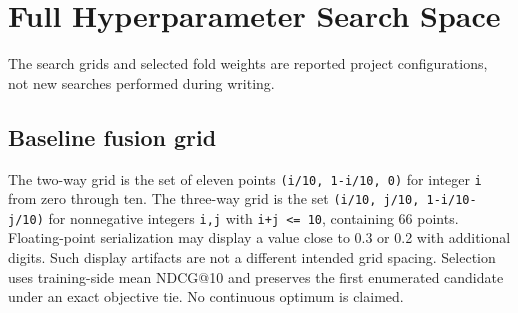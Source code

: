 \chapter{Full Hyperparameter Search Space}

The search grids and selected fold weights are reported project configurations, not new searches performed during writing.
\section{Baseline fusion grid}

The two-way grid is the set of eleven points \texttt{(i/10, 1\allowbreak{}-i/10, 0\allowbreak{})} for integer \texttt{i} from zero through ten. The three-way grid is the set \texttt{(i/10, j\allowbreak{}/10, 1-i\allowbreak{}/10-j/10\allowbreak{})} for nonnegative integers \texttt{i,j} with \texttt{i+j <= 1\allowbreak{}0}, containing 66 points. Floating-point serialization may display a value close to 0.3 or 0.2 with additional digits. Such display artifacts are not a different intended grid spacing. Selection uses training-side mean NDCG@10 and preserves the first enumerated candidate under an exact objective tie. No continuous optimum is claimed.

